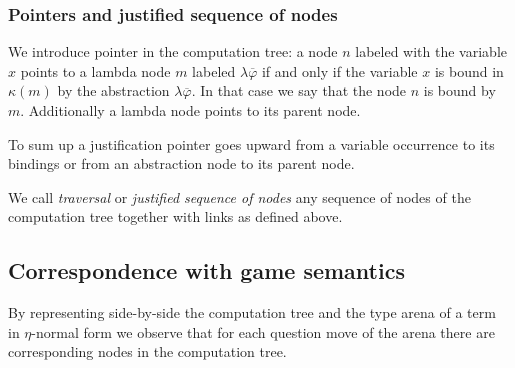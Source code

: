 \subsubsection{Pointers and justified sequence of nodes}

We introduce pointer in the computation tree: a node $n$ labeled
with the variable $x$ points to a lambda node $m$ labeled $\lambda
\overline{\varphi}$ if and only if the variable $x$ is bound in
$\kappa(m)$ by the abstraction $\lambda \overline{\varphi}$. In that
case we say that the node $n$ is bound by $m$. Additionally a lambda node points to its parent node.

To sum up a justification pointer goes upward from a variable occurrence to its bindings or from an abstraction node to its parent node.


We call \emph{traversal} or \emph{justified sequence of nodes} any sequence of nodes of the computation tree together
with links as defined above.

\subsection{Correspondence with game semantics}

By representing side-by-side the computation tree and the type arena of a term in $\eta$-normal form we observe
that for each question move of the arena there are corresponding nodes in the computation tree.

